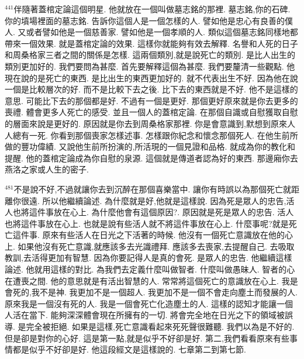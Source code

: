 \documentclass{book}
\begin{document}
$^{441}$伴隨著蓋棺定論這個明星.
他就放在一個叫做墓志銘的那裡.
墓志銘,你的石碑.
你的墳場裡面的墓志銘.
告訴你這個人是一個怎樣的人.
譬如他是忠心有良善的僕人.
又或者譬如他是一個慈善家.
譬如他是一個孝順的人.
類似這個墓志銘同樣地都帶來一個效果.
就是蓋棺定論的效果.
這樣你就能夠有效去解釋.
名譽和人死的日子和周桑格家三者之間的關係是怎樣.
這兩個類別,就是說死亡的類別.
是比人出生的類別更加好的.
我們要問為甚麼.
首先要解釋這個為甚麼.
我們要釐清一些觀點.
他現在說的是死亡的東西.
是比出生的東西更加好的.
就不代表出生不好.
因為他在說一個是比較層次的好.
而不是比較下去之後.
比下去的東西就是不好.
他不是這樣的意思.
可能比下去的那個都是好.
不過有一個是更好.
那個更好原來就是你去更多的喪禮.
體會更多人死亡的感受.
並且一個人的蓋棺定論.
在那個自識或自慰獲取自慰的層面來說是更好的.
原因就是你去到周桑格家那裡.
你是會意識到,默想到原來人人總有一死.
你看到那個喪家怎樣述事.
怎樣跟你紀念和懷念那個死人.
在他生前所做的豐功偉績.
又說他生前所扮演的,所活現的一個見證和品格.
就成為你的教化和提醒.
他的蓋棺定論成為你自慰的泉源.
這個就是傳道者認為好的東西.
那邊廂你去燕洛之家或人生的密子.

$^{481}$不是說不好,不過就讓你去到沉醉在那個喜樂當中.
讓你有時誤以為那個死亡就距離你很遠.
所以他繼續論述.
為什麼就是好,他就是這樣說.
因為死是眾人的忠告,活人也將這件事放在心上.
為什麼他會有這個原因?.
原因就是死是眾人的忠告.
活人也將這件事放在心上.
也就是說有些活人就不將這件事放在心上.
什麼事呢?就是死亡這件事.
原來有些活人在日光之下活著的時候.
他沒有一個死亡意識放在他的心上.
如果他沒有死亡意識,就應該多去光識禮拜.
應該多去喪家,去提醒自己.
去吸取教訓,去活得更加有智慧.
因為你要記得人是真的會死.
是眾人的忠告.
他繼續這樣論述.
他就用這樣的對比.
為我們去定義什麼叫做智者.
什麼叫做愚昧人.
智者的心在遭喪之間.
他的意思就是有活出智慧的人.
常常將這個死亡的意識放在心上.
我是會死的,我不是神.
我更加不是一個超人.
我更加不是一個不會走向塵土而發展的人.
原來我是一個沒有死的人.
我是一個會死亡化造塵土的人.
這樣的認知才能讓一個人活在當下.
能夠深深體會現在所擁有的一切.
將會完全地在日光之下的領域被誤導.
是完全被拒絕.
如果是這樣,死亡意識看起來死死聲很難聽.
我們以為是不好的.
但是卻是對你的心好.
這是第一點,就是似乎不好卻是好.
第二,我們看看原來有些事情都是似乎不好卻是好.
他這段經文是這樣說的.
七章第二到第七節.
\end{document}
